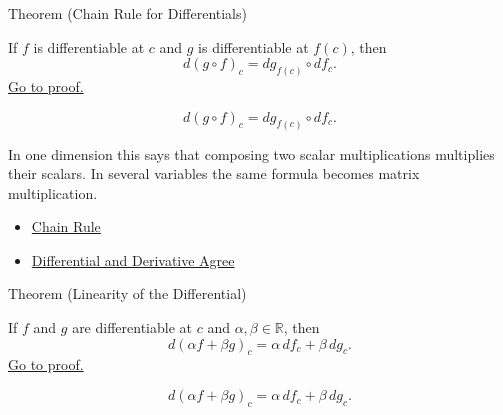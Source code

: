 \begin{theorembox}{Theorem (Chain Rule for Differentials)}
\begin{theorem}
\label{thm:chain-rule-for-differentials}
If $f$ is differentiable at $c$ and $g$ is differentiable at $f(c)$, then
\[
  d(g\circ f)_c=dg_{f(c)}\circ df_c.
\]
\hyperref[prf:chain-rule-for-differentials]{Go to proof.}
\end{theorem}
\end{theorembox}

\begin{remark*}
\[
  d(g\circ f)_c=dg_{f(c)}\circ df_c.
\]
\end{remark*}

\begin{remark*}[Interpretation]
In one dimension this says that composing two scalar multiplications multiplies their scalars. In several variables the same formula becomes matrix multiplication.
\end{remark*}

\begin{dependencies}
\begin{itemize}
  \item \hyperref[thm:chain-rule]{Chain Rule}
  \item \hyperref[thm:differential-and-derivative-agree]{Differential and Derivative Agree}
\end{itemize}
\end{dependencies}

\begin{theorembox}{Theorem (Linearity of the Differential)}
\begin{theorem}
\label{thm:linearity-of-the-differential}
If $f$ and $g$ are differentiable at $c$ and $\alpha,\beta\in\mathbb{R}$, then
\[
  d(\alpha f+\beta g)_c=\alpha\,df_c+\beta\,dg_c.
\]
\hyperref[prf:linearity-of-the-differential]{Go to proof.}
\end{theorem}
\end{theorembox}

\begin{remark*}
\[
  d(\alpha f+\beta g)_c=\alpha\,df_c+\beta\,dg_c.
\]
\end{remark*}

